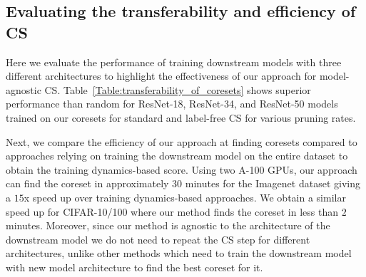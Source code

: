 \begin{figure*}[t]
\end{figure*}

\subsection{Evaluating the transferability and efficiency of CS}
Here we evaluate the performance of training downstream models with three different architectures to highlight the effectiveness of our approach for model-agnostic CS.
Table~\ref{Table:transferability_of_coresets} shows superior performance than random for ResNet-18, ResNet-34, and ResNet-50 models trained on our coresets for standard and label-free CS for various pruning rates. 


Next, we compare the efficiency of our approach at finding coresets compared to approaches relying on training the downstream model on the entire dataset to obtain the training dynamics-based score. 
Using two A-100 GPUs, our approach can find the coreset in approximately $30$ minutes for the Imagenet dataset giving a $15$x speed up over training dynamics-based approaches. 
We obtain a similar speed up for CIFAR-10/100 where our method finds the coreset in less than $2$ minutes.
Moreover, since our method is agnostic to the architecture of the downstream model we do not need to repeat the CS step for different architectures, unlike other methods which need to train the downstream model with new model architecture to find the best coreset for it.

